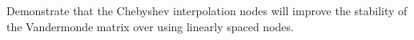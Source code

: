 \begin{problem}
    Demonstrate that the Chebyshev interpolation nodes will improve the stability of the
    Vandermonde matrix over using linearly spaced nodes.
\end{problem}


% 
